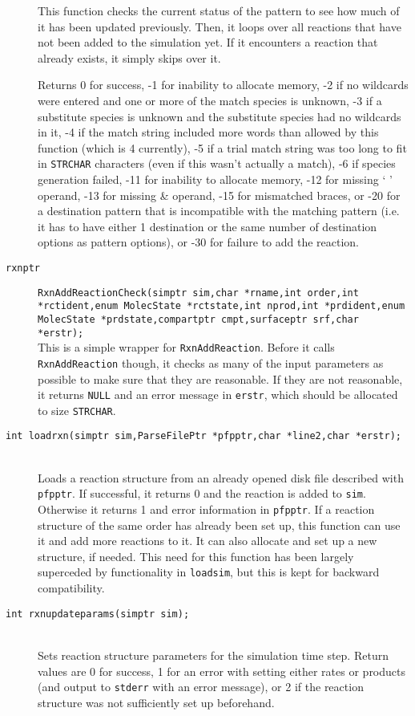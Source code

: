 \documentclass {book}
\newcommand {\ttt} {\texttt}
\begin{document}
\begin{description}
This function checks the current status of the pattern to see how much of it has been updated previously. Then, it loops over all reactions that have not been added to the simulation yet. If it encounters a reaction that already exists, it simply skips over it.

Returns 0 for success, -1 for inability to allocate memory, -2 if no wildcards were entered and one or more of the match species is unknown, -3 if a substitute species is unknown and the substitute species had no wildcards in it, -4 if the match string included more words than allowed by this function (which is 4 currently), -5 if a trial match string was too long to fit in \ttt{STRCHAR} characters (even if this wasn't actually a match), -6 if species generation failed, -11 for inability to allocate memory, -12 for missing ` ' operand, -13 for missing \& operand, -15 for mismatched braces, or -20 for a destination pattern that is incompatible with the matching pattern (i.e. it has to have either 1 destination or the same number of destination options as pattern options), or -30 for failure to add the reaction.

\item[\ttt{rxnptr}]
\ttt{RxnAddReactionCheck(simptr sim,char *rname,int order,int *rctident,enum MolecState *rctstate,int nprod,int *prdident,enum MolecState *prdstate,compartptr cmpt,surfaceptr srf,char *erstr);} \\
This is a simple wrapper for \ttt{RxnAddReaction}. Before it calls \ttt{RxnAddReaction} though, it checks as many of the input parameters as possible to make sure that they are reasonable. If they are not reasonable, it returns \ttt{NULL} and an error message in \ttt{erstr}, which should be allocated to size \ttt{STRCHAR}.

\item[\ttt{int loadrxn(simptr sim,ParseFilePtr *pfpptr,char *line2,char *erstr);}]
\hfill \\
Loads a reaction structure from an already opened disk file described with \ttt{pfpptr}. If successful, it returns 0 and the reaction is added to \ttt{sim}. Otherwise it returns 1 and error information in \ttt{pfpptr}. If a reaction structure of the same order has already been set up, this function can use it and add more reactions to it. It can also allocate and set up a new structure, if needed. This need for this function has been largely superceded by functionality in \ttt{loadsim}, but this is kept for backward compatibility.

\item[\ttt{int rxnupdateparams(simptr sim);}]
\hfill \\
Sets reaction structure parameters for the simulation time step. Return values are 0 for success, 1 for an error with setting either rates or products (and output to \ttt{stderr} with an error message), or 2 if the reaction structure was not sufficiently set up beforehand.


\end{description}
\end{document}
